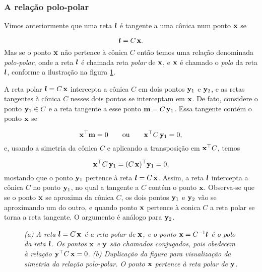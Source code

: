 \subsubsection{A relação polo-polar}\label{sec.polo-polar}

Vimos anteriormente que uma reta $\boldsymbol{l}$ é tangente a uma cônica num ponto $\mathbf{x}$ se 

\begin{equation*}
\boldsymbol{l}=C\,\mathbf{x}.
\end{equation*}
Mas se o ponto $\mathbf{x}$ não pertence à cônica $C$ então temos uma relação denominada \textit{polo-polar}, onde a reta $\boldsymbol{l}$ é chamada reta \textit{polar} de $\mathbf{x}$, e $\mathbf{x}$ é chamado o \textit{polo} da reta $\boldsymbol{l}$, conforme a ilustração na figura \ref{fig.polo-polar}.

A reta polar $\boldsymbol{l}=C\,\mathbf{x}$ intercepta a cônica 
$C$ em dois pontos ${\bf y}_1$ e ${\bf y}_2$, e as retas tangentes à cônica $C$ nesses dois pontos se interceptam em $\mathbf{x}$. De fato, considere o ponto ${\bf y}_1 \in C$ e a reta tangente a esse ponto ${\bf m}=C\,{\bf y}_1$. Essa tangente contém o ponto $\mathbf{x}$ se 

\begin{equation*}
\mathbf{x}^\top{\bf m}=0\qquad\text{ou}\qquad\mathbf{x}^\top C\,{\bf y}_1=0,
\end{equation*}  
e, usando a simetria da cônica $C$ e aplicando a transposição em $\mathbf{x}^\top C$, temos

\begin{equation*}
\mathbf{x}^\top C\,{\bf y}_1=(C\,\mathbf{x})^\top{\bf y}_1=0,
\end{equation*}
mostando que o ponto ${\bf y}_1$ pertence à reta $\boldsymbol{l}=C\,\mathbf{x}$. Assim, a reta $\boldsymbol{l}$ intercepta a cônica $C$ no ponto ${\bf y}_1$, no qual a tangente a $C$ contém o ponto $\mathbf{x}$. Observa-se que se o ponto $\mathbf{x}$ se aproxima da cônica $C$, os dois pontos ${\bf y}_1$ e ${\bf y}_2$ vão se aproximando um do outro, e quando ponto $\mathbf{x}$ pertence à conica $C$ a reta polar se torna a reta tangente. O argumento é análogo para ${\bf y}_2$.\\


\begin{figure}[!htb]
\centering
{}
\quad
{}
\caption{\textit{(a) A reta $\boldsymbol{l}=C\,\mathbf{x}$ é a reta polar de $\mathbf{x}$, e o ponto $\mathbf{x}=C^{-1}\boldsymbol{l}$ é o polo da reta $\boldsymbol{l}$. Os pontos $\mathbf{x}$ e ${\bf y}$ são chamados conjugados, pois obedecem à relação ${\bf y}^\top C\,\mathbf{x}=0$. (b) Duplicação da figura para visualização da simetria da relação polo-polar. O ponto $\mathbf{x}$ pertence à reta polar de ${\bf y}$.}}
\label{fig.polo-polar}
\end{figure}






